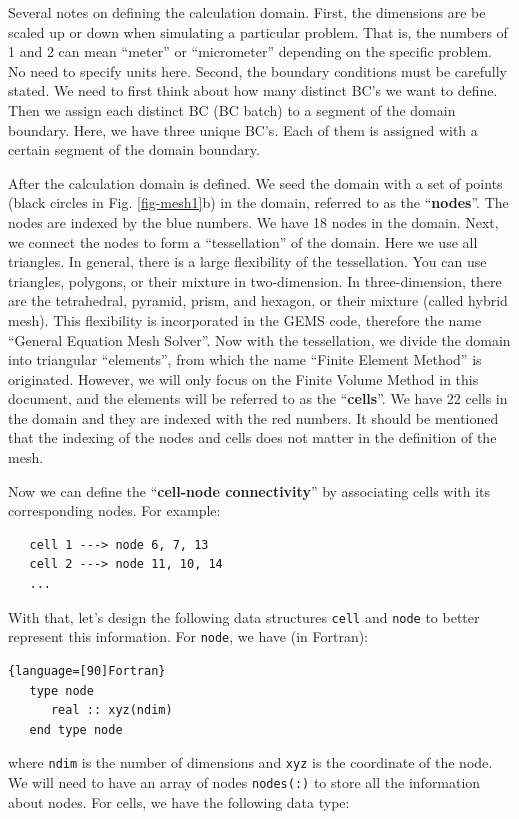 \documentclass[11pt, letterpaper]{report}
\begin{document}
Several notes on defining the calculation domain. First, the dimensions are be scaled up or down
when simulating a particular problem. That is, the numbers of 1 and 2 can mean ``meter'' or
``micrometer'' depending on the specific problem. No need to specify units here. Second, the
boundary conditions must be carefully stated. We need to first think about how many distinct BC's we
want to define. Then we assign each distinct BC (BC batch) to a segment of the domain boundary. Here,
we have three unique BC's. Each of them is assigned with a certain segment of the domain boundary.
\paraspace

After the calculation domain is defined. We seed the domain with a set of points (black circles in
Fig. \ref{fig-mesh1}b) in the domain, referred to as the ``{\bf nodes}''. The nodes are indexed by
the blue numbers. We have 18 nodes in the domain. Next, we connect the nodes to form a
``tessellation'' of the domain. Here we use all triangles. In general, there is a large flexibility
of the tessellation. You can use triangles, polygons, or their mixture in two-dimension. In
three-dimension, there are the tetrahedral, pyramid, prism, and hexagon, or their mixture (called
hybrid mesh). This flexibility is incorporated in the GEMS code, therefore the name ``General
Equation Mesh Solver''.  Now with the tessellation, we divide the domain into triangular
``elements'', from which the name ``Finite Element Method'' is originated. However, we will only
focus on the Finite Volume Method in this document, and the elements will be referred to as the
``{\bf cells}''. We have 22 cells in the domain and they are indexed with the red numbers. It should
be mentioned that the indexing of the nodes and cells does not matter in the definition of the mesh.
\paraspace

Now we can define the ``{\bf cell-node connectivity}'' by associating cells with its corresponding
nodes. For example:
\begin{verbatim}
   cell 1 ---> node 6, 7, 13
   cell 2 ---> node 11, 10, 14
   ...
\end{verbatim}
With that, let's design the following data structures \verb+cell+ and \verb+node+ to better
represent this information. For \verb+node+, we have (in Fortran):

\begin{lstlisting}{language=[90]Fortran}
   type node
      real :: xyz(ndim)
   end type node
\end{lstlisting}

where \verb+ndim+ is the number of dimensions and \verb+xyz+ is the coordinate of the node. We will
need to have an array of nodes \verb+nodes(:)+ to store all the information about nodes. For cells,
we have the following data type:
\end{document}
